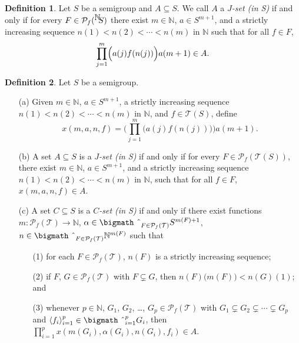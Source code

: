 \documentclass[12pt]{article}
\theoremstyle{plain}
\theoremstyle{definition}
\newtheorem*{defn}{Definition}
\newcommand{\la}{\langle}
\newcommand{\ra}{\rangle}
\newcommand{\bbN}{\mathbb{N}}
\newcommand{\calT}{\mathcal{T}}
\newcommand{\Pf}{\mathcal{P}_f}
\newcommand{\setfunc}[2]{\hbox{${}^{\hbox{$#1$}}\hskip -3 pt #2$}}
\newcommand{\bigtimes}{\hbox{\bigmath \char'2}}
\begin{document}
\begin{defn}
  Let $S$ be a semigroup and $A \subseteq S$.
  We call $A$ a \textsl{$J$-set (in S)} if and only if for every $F
  \in \Pf(\setfunc{\bbN}{S})$ there exist $m \in \bbN$, $a \in
  S^{m+1}$, and a strictly increasing sequence $n(1) < n(2) < \cdots <
  n(m)$ in $\bbN$ such that for all $f \in F$,
  \[
    \prod_{j=1}^m \Bigr( a(j) f(n(j)) \Bigl) a(m+1) \in A.
  \]
\end{defn}

\begin{defn}
  Let $S$ be a semigroup.
  \begin{itemize}
    \item[(a)] Given $m \in \bbN$, $a \in S^{m+1}$, a strictly
      increasing sequence $n(1) < n(2) < \cdots < n(m)$ in $\bbN$, and
      $f \in \calT(S)$, define
      \[
        x(m, a, n, f) = \biggl( \prod_{j=1}^m \bigl( a(j) f(n(j))
        \bigr) \biggr) a(m+1).
      \]
      
    \item[(b)] A set $A \subseteq S$ is a \textsl{$J$-set (in S)} if
      and only if for every $F \in \Pf(\calT(S))$, there exist $m \in
      \bbN$, $a \in S^{m+1}$, and a strictly increasing sequence $n(1)
      < n(2) < \cdots < n(m)$ in $\bbN$, such that for all $f \in F$,
      $x(m, a, n, f) \in A$. 

    \item[(c)] A set $C \subseteq S$ is a \textsl{$C$-set (in S)} if
      and only if there exist functions $m \colon \Pf(\calT) \to
      \bbN$, $\alpha \in \bigtimes_{F \in \Pf(\calT)} S^{m(F) + 1}$,
      $n \in \bigtimes_{F \in \Pf(\calT)} \bbN^{m(F)}$ such that 
      \begin{itemize}
        \item[(1)] for each $F \in \Pf(\calT)$, $n(F)$ is a strictly
          increasing sequence;
        
        \item[(2)] if $F$, $G \in \Pf(\calT)$ with $F \subsetneq G$,
          then $n(F)\bigl(m(F)\bigr) < n(G)(1)$; and

        \item[(3)] whenever $p \in \bbN$, $G_1$, $G_2$, \ldots, $G_p
          \in \Pf(\calT)$ with $G_1 \subsetneq G_2 \subsetneq \cdots
          \subsetneq G_p$ and $\la f_i \ra_{i=1}^p \in
          \bigtimes_{i=1}^p G_i$, then $\prod_{i=1}^p x(m(G_i),
          \alpha(G_i), n(G_i), f_i) \in A$. 
      \end{itemize}
  \end{itemize}
\end{defn}
\end{document}
